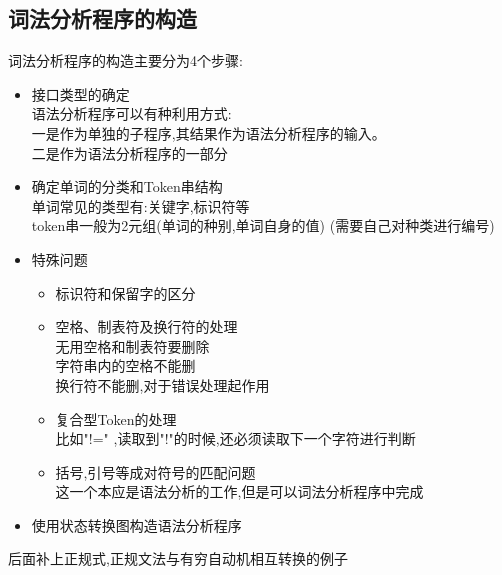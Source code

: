   \subsection{词法分析程序的构造}
  词法分析程序的构造主要分为4个步骤:
  \begin{itemize}
    \item 接口类型的确定\\
    语法分析程序可以有种利用方式:\\
    一是作为单独的子程序,其结果作为语法分析程序的输入。\\
    二是作为语法分析程序的一部分
    \item 确定单词的分类和Token串结构\\
    单词常见的类型有:关键字,标识符等\\
    token串一般为2元组(单词的种别,单词自身的值)  (需要自己对种类进行编号)

    \item 特殊问题
    \begin{itemize}
      \item 标识符和保留字的区分
      \item 空格、制表符及换行符的处理\\
      无用空格和制表符要删除\\
      字符串内的空格不能删\\
      换行符不能删,对于错误处理起作用
      \item 复合型Token的处理\\
      比如"!=" ,读取到"!"的时候,还必须读取下一个字符进行判断
      \item 括号,引号等成对符号的匹配问题\\
      这一个本应是语法分析的工作,但是可以词法分析程序中完成
    \end{itemize}

    \item 使用状态转换图构造语法分析程序
  \end{itemize}

  {\color{red}后面补上正规式,正规文法与有穷自动机相互转换的例子}

